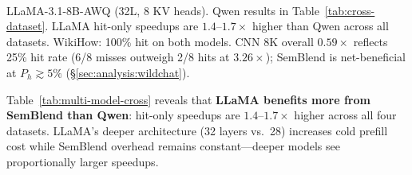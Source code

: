 \documentclass[10pt,twocolumn]{article}
\begin{document}
\begin{table}[t]
\centering
\caption{\textbf{Multi-model TTFT comparison} on real-world datasets.
Both models on A10G, $n{=}8$ per length, clean server state per dataset.
Hit-only speedup excludes misses for fair comparison.}
\label{tab:multi-model-cross}
\footnotesize
\setlength{\tabcolsep}{3pt}
\\[2pt]
{\footnotesize LLaMA-3.1-8B-AWQ (32L, 8 KV heads).
Qwen results in Table~\ref{tab:cross-dataset}.
LLaMA hit-only speedups are $1.4$--$1.7\times$ higher than Qwen across
all datasets. WikiHow: 100\% hit on both models. CNN 8K overall
$0.59\times$ reflects 25\% hit rate (6/8 misses outweigh 2/8 hits at
$3.26\times$); SemBlend is net-beneficial at $P_h \gtrsim 5\%$
(\S\ref{sec:analysis:wildchat}).}
\end{table}

Table~\ref{tab:multi-model-cross} reveals that \textbf{LLaMA benefits
more from SemBlend than Qwen}: hit-only speedups are $1.4$--$1.7\times$
higher across all four datasets. LLaMA's deeper architecture (32 layers
vs.\ 28) increases cold prefill cost while SemBlend overhead remains
constant---deeper models see proportionally larger speedups.
\end{document}
